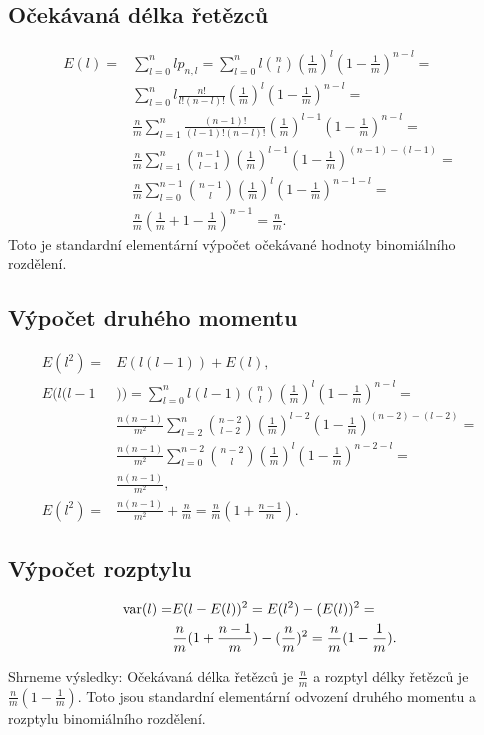 \documentclass[a4paper,12pt]{article}
\begin{document}
\subsection{
Očekávaná délka řetězců
}
\begin{align*} E(l)=&\sum_{l=0}^nlp_{n,l}=\sum_{l=0}^nl\binom nl(\frac 
1m)^l(1-\frac 1m)^{n-l}=\\
&\sum_{l=0}^nl\frac {n!}{l!(n-l)!}(\frac 1m)^l(1-\frac 1m)^{n-l}=\\
&\frac nm\sum_{l=1}^n\frac {(n-1)!}{(l-1)!(n-l)!}(\frac 1m)^{l-1}
(1-\frac 1m)^{n-l}=\\
&\frac nm\sum_{l=1}^n\binom {n-1}{l-1}(\frac 1m)^{l-1}(1-\frac 1m
)^{(n-1)-(l-1)}=\\
&\frac nm\sum_{l=0}^{n-1}\binom {n-1}l(\frac 1m)^l(1-\frac 1m)^{n
-1-l}=\\
&\frac nm(\frac 1m+1-\frac 1m)^{n-1}=\frac nm.\end{align*}
Toto je standardní elementární výpočet 
očekávané hodnoty binomiálního rozdělení.  

\subsection{
Výpočet druhého momentu
}

\begin{align*} E(l^2)=&E(l(l-1))+E(l),\\
E(l(l-1&))=\sum_{l=0}^nl(l-1)\binom nl(\frac 1m)^l(1-\frac 1m)^{n
-l}=\\
&\frac {n(n-1)}{m^2}\sum_{l=2}^n\binom {n-2}{l-2}(\frac 1m)^{l-2}
(1-\frac 1m)^{(n-2)-(l-2)}=\\
&\frac {n(n-1)}{m^2}\sum_{l=0}^{n-2}\binom {n-2}l(\frac 1m)^l(1-\frac 
1m)^{n-2-l}=\\
&\frac {n(n-1)}{m^2},\\
E(l^2)=&\frac {n(n-1)}{m^2}+\frac nm=\frac nm(1+\frac {n-1}m).\end{align*}
\subsection{
Výpočet rozptylu
}

\begin{align*}\operatorname{var}(l)=&E(l-E(l))^2=E(l^2)-(E(l))^2=\\
&\frac nm(1+\frac {n-1}m)-(\frac nm)^2=\frac nm(1-\frac 1m).\end{align*}

Shrneme výsledky:\newline 
Očekávaná délka řetězců je $\frac nm$ a rozptyl délky 
řetězců je $\frac nm(1-\frac 1m)$.
Toto jsou standardní elementární odvození druhého momentu
a rozptylu binomiálního rozdělení.
\end{document}
